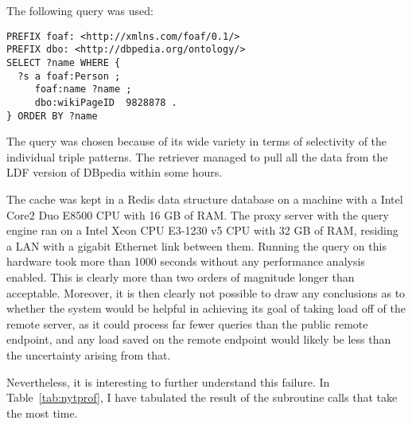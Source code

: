 The following query was used:

\begin{verbatim}
PREFIX foaf: <http://xmlns.com/foaf/0.1/>
PREFIX dbo: <http://dbpedia.org/ontology/>
SELECT ?name WHERE {
  ?s a foaf:Person ;
     foaf:name ?name ;
     dbo:wikiPageID  9828878 .
} ORDER BY ?name
\end{verbatim}

The query was chosen because of its wide variety in terms of
selectivity of the individual triple patterns. The retriever managed
to pull all the data from the LDF version of DBpedia
within some hours. 

The cache was kept in a Redis data structure database on a machine
with a Intel Core2 Duo E8500 CPU with 16 GB of RAM. The proxy server
with the query engine ran on a Intel Xeon CPU E3-1230 v5 CPU with 32
GB of RAM, residing a LAN with a gigabit Ethernet link between
them. Running the query on this hardware took more than 1000 seconds
without any performance analysis enabled. This is clearly more than
two orders of magnitude longer than acceptable. Moreover, it is then
clearly not possible to draw any conclusions as to whether the system
would be helpful in achieving its goal of taking load off of the
remote server, as it could process far fewer queries than the public
remote endpoint, and any load saved on the remote endpoint would
likely be less than the uncertainty arising from that.

Nevertheless, it is interesting to further understand this failure. In
Table~\ref{tab:nytprof}, I have tabulated the result of the subroutine
calls that take the most time.

